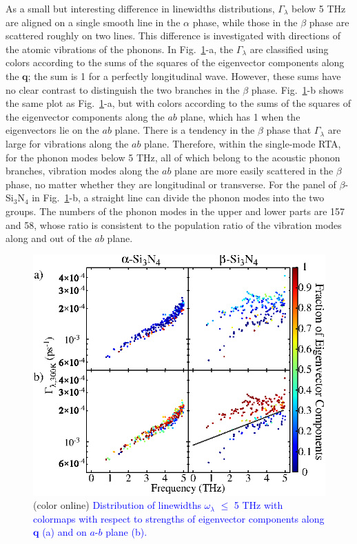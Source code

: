 \documentclass[twocolumn,amsmath,amssymb,a4paper,prb,superscriptaddress,floatfix]{revtex4-1}
\begin{document}
As a small but interesting difference in linewidths distributions, 
$\Gamma_\lambda$ below 5 THz are aligned on a
single smooth line in the $\alpha$ phase, while those in the $\beta$ phase are
scattered roughly on two lines. This difference is investigated with 
directions of the atomic vibrations of the phonons. In Fig.~\ref{fig:Fig7_338}-a, the $\Gamma_\lambda$ are
classified using colors according to the sums of the squares of the eigenvector
components along the $\mathbf{q}$; the sum is 1 for a perfectly longitudinal
wave. However, these sums have no clear contrast to distinguish the two branches
in the $\beta$ phase.  Fig.~\ref{fig:Fig7_338}-b shows the same plot as
Fig.~\ref{fig:Fig7_338}-a, but with colors according to the sums of the squares
of the eigenvector components along the $ab$ plane, which has 1 when the
eigenvectors lie on the $ab$ plane. There is a tendency in the $\beta$ phase
that  $\Gamma_\lambda$ are large for vibrations along the $ab$ plane.
Therefore, within the single-mode RTA, for the phonon modes below 5 THz, all of
which belong to the acoustic phonon branches, vibration modes along the $ab$
plane are more easily scattered in the $\beta$ phase, no matter whether they are
longitudinal or transverse. For the panel of $\beta$-Si$_3$N$_4$ in
Fig.~\ref{fig:Fig7_338}-b, a straight line can divide the phonon modes into the
two groups. The numbers of the phonon modes in the upper and lower parts are 157
and 58, whose ratio is consistent to the population ratio of the vibration modes
along and out of the $ab$ plane.


\begin{figure}[ht]
 \centering
  \includegraphics[width=\linewidth]{figure_analyze_gamma3_m1010_print.eps} \caption{(color
	  online) \textcolor{blue}{Distribution of linewidths $\omega_\lambda$ $\leq$ 5 THz
		  with colormaps with respect to strengths of eigenvector components along $\mathbf q$ (a)
		  and on $a$-$b$ plane (b).} \label{fig:Fig7_338}} 
 \centering
\end{figure}
\end{document}
